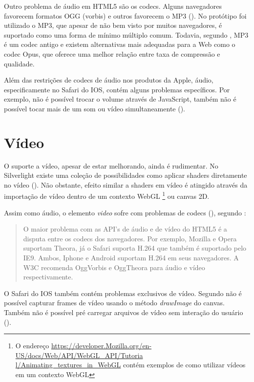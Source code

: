 Outro problema de áudio em HTML5 são os codecs. Alguns
navegadores favorecem formatos OGG (vorbis) e outros favorecem o
MP3 ().
No protótipo foi utilizado o MP3, que apesar de não bem visto por
muitos navegadores, é suportado como uma forma de mínimo múltiplo
comum. Todavia, segundo \citet{opus}, MP3 é um codec antigo e existem
alternativas mais adequadas para a Web como o codec Opus, que oferece
uma melhor relação entre taxa de compressão e qualidade.

Além das restrições de codecs de áudio nos produtos da Apple,
áudio, especificamente no Safari do IOS, contém alguns problemas
específicos. Por exemplo, não é possível trocar o volume
através de JavaScript, também não é possível tocar mais de um
som ou vídeo simultaneamente \textsc{\autocite{unsolvedMediaHtmlIssues}}
().

\section{Vídeo}

O suporte a vídeo, apesar de estar melhorando, ainda é rudimentar.
No Silverlight existe uma coleção de possibilidades como aplicar
shaders diretamente no vídeo \textsc{\autocite[p. 8]{researchOnHtml}}
(). Não obstante, efeito similar
a shaders em vídeo é atingido através da importação de
vídeo dentro de um contexto WebGL \footnote{O endereço
\url{https://developer.Mozilla.org/en-US/docs/Web/API/WebGL_API/Tutoria
l/Animating_textures_in_WebGL} contém exemplos de como utilizar vídeos
em um contexto WebGL} ou canvas 2D.

Assim como áudio, o elemento \textit{video} sofre com problemas de
codecs (), segundo \citet{html5Tradeoffs}:
\begin{quote}
O maior problema com as API's de áudio e de vídeo do HTML5 é
a disputa entre os codecs dos navegadores. Por exemplo, Mozilla e
Opera suportam Theora, já o Safari suporta H.264 que também é
suportado pelo IE9. Ambos, Iphone e Android suportam H.264 em seus
navegadores. A W3C recomenda OggVorbis e OggTheora para áudio e vídeo
respectivamente.
\end{quote}

O Safari do IOS também contém problemas exclusivos de vídeo. Segundo
\citet{unsolvedMediaHtmlIssues} não é possível capturar frames de
vídeo usando o método \textit{drawImage} do canvas. Também não é
possível pré carregar arquivos de vídeo sem interação do usuário
().

